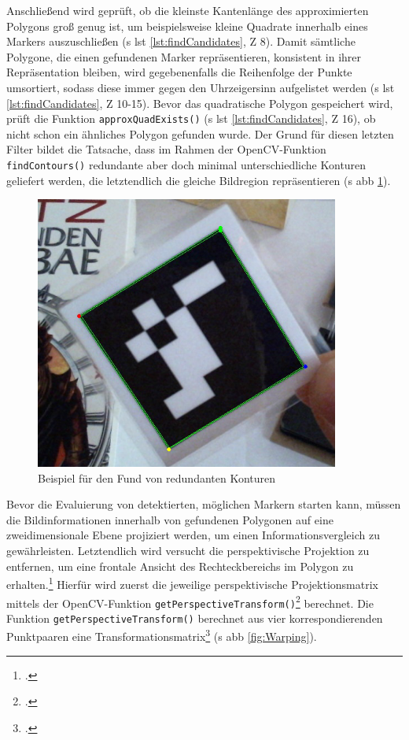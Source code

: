 \noindent Anschließend wird geprüft, ob die kleinste Kantenlänge des approximierten Polygons groß genug ist, um beispielsweise kleine Quadrate innerhalb eines Markers auszuschließen (\acs{s} \acs{lst} \ref{lst:findCandidates}, \acs{Z} 8). Damit sämtliche Polygone, die einen gefundenen Marker repräsentieren, konsistent in ihrer Repräsentation bleiben, wird gegebenenfalls die Reihenfolge der Punkte umsortiert, sodass diese immer gegen den Uhrzeigersinn aufgelistet werden (\acs{s} \acs{lst} \ref{lst:findCandidates}, \acs{Z} 10-15). Bevor das quadratische Polygon gespeichert wird, prüft die Funktion \texttt{approxQuadExists()} (\acs{s} \acs{lst} \ref{lst:findCandidates}, \acs{Z} 16), ob nicht schon ein ähnliches Polygon gefunden wurde. Der Grund für diesen letzten Filter bildet die Tatsache, dass im Rahmen der OpenCV-Funktion \texttt{findContours()} redundante aber doch minimal unterschiedliche Konturen geliefert werden, die letztendlich die gleiche Bildregion repräsentieren (\acs{s} \acs{abb} \ref{fig:DoubleExample}).

\begin{figure}[H]
\centering
\includegraphics[width=10cm]{Bilder/Implementierung/double.png}
\caption{Beispiel für den Fund von redundanten Konturen}
\label{fig:DoubleExample}
\end{figure}

\noindent Bevor die Evaluierung von detektierten, möglichen Markern starten kann, müssen die Bildinformationen innerhalb von gefundenen Polygonen auf eine zweidimensionale Ebene projiziert werden, um einen Informationsvergleich zu gewährleisten. Letztendlich wird versucht die perspektivische Projektion zu entfernen, um eine frontale Ansicht des Rechteckbereichs im Polygon zu erhalten.\footcite[Vgl.][\ac{S}. 70]{Baggio2012} Hierfür wird zuerst die jeweilige perspektivische Projektionsmatrix mittels der OpenCV-Funktion \texttt{getPerspectiveTransform()}\footcite{opencvgetPerspectiveTransform} berechnet. Die Funktion \texttt{getPerspectiveTransform()} berechnet aus vier korrespondierenden Punktpaaren eine Transformationsmatrix\footcite{opencvgetPerspectiveTransform} (\acs{s} \acs{abb} \ref{fig:Warping}).

